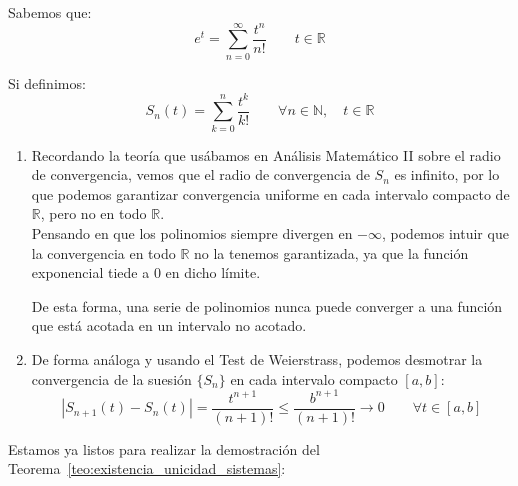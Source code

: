 \begin{ejemplo}
    Sabemos que:
    \begin{equation*}
        e^t = \sum_{n=0}^{\infty} \dfrac{t^n}{n!} \qquad t\in \mathbb{R}
    \end{equation*}

    Si definimos:
    \begin{equation*}
        S_n(t) = \sum_{k=0}^{n} \dfrac{t^k}{k!} \qquad \forall n\in \mathbb{N}, \quad t\in \mathbb{R}
    \end{equation*}

    \begin{enumerate}
        \item Recordando la teoría que usábamos en Análisis Matemático II sobre el radio de convergencia, vemos que el radio de convergencia de $S_n$ es infinito, por lo que podemos garantizar convergencia uniforme en cada intervalo compacto de $\mathbb{R}$, pero no en todo $\mathbb{R}$.\\

            Pensando en que los polinomios siempre divergen en $-\infty$, podemos intuir que la convergencia en todo $\mathbb{R}$ no la tenemos garantizada, ya que la función exponencial tiede a 0 en dicho límite.

    De esta forma, una serie de polinomios nunca puede converger a una función que está acotada en un intervalo no acotado.
\item De forma análoga y usando el Test de Weierstrass, podemos desmotrar la convergencia de la suesión $\{S_n\}$ en cada intervalo compacto $[a,b]$:
            \begin{equation*}
                |S_{n+1}(t) - S_n(t)| = \dfrac{t^{n+1}}{(n+1)!} \leq \dfrac{b^{n+1}}{(n+1)!} \longrightarrow 0 \qquad \forall t\in [a,b]
            \end{equation*}
    \end{enumerate}
\end{ejemplo}

\noindent
Estamos ya listos para realizar la demostración del Teorema~\ref{teo:existencia_unicidad_sistemas}:

